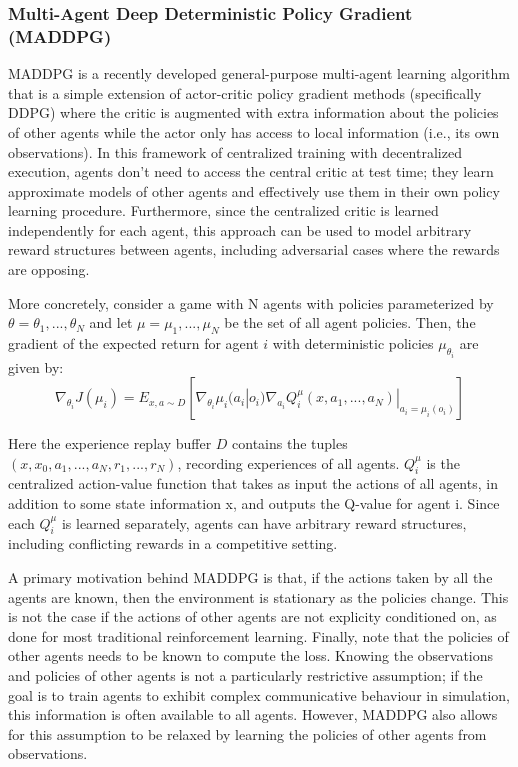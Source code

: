 \subsubsection{Multi-Agent Deep Deterministic Policy Gradient (MADDPG)}
MADDPG is a recently developed general-purpose multi-agent learning algorithm that is a simple extension of actor-critic policy gradient methods (specifically DDPG) where the critic is augmented with extra information about the policies of other 
agents while the actor only has access to local information (i.e., its own observations). In this framework of centralized training with decentralized execution, agents don’t need to access the central critic at test time; they learn approximate models of other agents and effectively use them in their own policy learning procedure. Furthermore, since the centralized critic is
learned independently for each agent, this approach can be used to model arbitrary reward structures between agents, including adversarial cases where the rewards are opposing.

More concretely, consider a game with N agents with policies parameterized by $\theta = {\theta_1, ..., \theta_N}$ and let $\mu = {\mu_1, ..., \mu_N}$ be the set of all agent policies. Then, the gradient of the expected return for agent $i$ with deterministic policies $\mu_{\theta_i}$ are given by:
\begin{equation}
\nabla_{\theta_i}J(\mu_i) = E_{x, a \sim D}[\nabla_{\theta_i}\mu_i(a_i|o_i)\nabla_{a_i}Q_i^{\mu}(x, a_1, ..., a_N)|_{a_i = \mu_i(o_i)}]
\end{equation}

Here the experience replay buffer $D$ contains the tuples $(x, x_0, a_1,..., a_N, r_1,..., r_N)$, recording experiences of all agents. $Q^{\mu}_i$ is the centralized action-value function that takes as input the actions of all agents, in addition to some state information x, and outputs the Q-value for agent i. Since each $Q^{\mu}_i$ is learned separately, agents can have 
arbitrary reward structures, including conflicting rewards in a competitive setting.  

A primary motivation behind MADDPG is that, if the actions taken by all the agents are known, then the environment is stationary as the policies change. This is not the case if the actions of other agents are not explicity conditioned on, as done for most traditional reinforcement learning. Finally, note that the policies of other agents needs to be known to compute the loss. Knowing the observations and policies of other agents is not a particularly restrictive assumption; if the goal is to train agents to exhibit complex communicative behaviour in simulation, this information is often available to all agents. However, MADDPG also allows for this assumption to be relaxed by learning the policies of other agents from observations.

